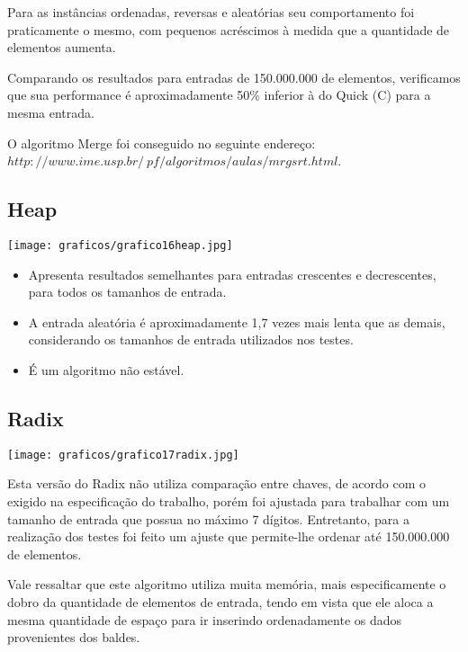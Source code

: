 \documentclass[12pt,a4paper]{article}
\begin{document}
Para as instâncias ordenadas, reversas e aleatórias seu comportamento foi praticamente o mesmo, com pequenos acréscimos à medida que a quantidade de elementos aumenta.

Comparando os resultados para entradas de 150.000.000 de elementos, verificamos que sua performance é aproximadamente 50\% inferior à do Quick (C) para a mesma entrada.  

O algoritmo Merge foi conseguido no seguinte endereço:\\
$http://www.ime.usp.br/~pf/algoritmos/aulas/mrgsrt.html$.








\subsection{Heap}
\begin{center}
\texttt{[image: graficos/grafico16heap.jpg]}
\end{center}
\begin{itemize}
\item Apresenta resultados semelhantes para entradas crescentes e decrescentes, para todos os tamanhos de entrada.
\item A entrada aleatória é aproximadamente 1,7 vezes mais lenta que as demais, considerando os tamanhos de entrada utilizados nos testes.
\item É um algoritmo não estável.
\end{itemize}






\subsection{Radix}
\begin{center}
\texttt{[image: graficos/grafico17radix.jpg]}
\end{center}

Esta versão do Radix não utiliza comparação entre chaves, de acordo com o exigido na especificação do trabalho, porém foi ajustada para trabalhar com um tamanho de entrada que possua no máximo 7 dígitos. Entretanto, para a realização dos testes foi feito um ajuste que permite-lhe ordenar até 150.000.000 de elementos.

Vale ressaltar que este algoritmo utiliza muita memória, mais especificamente o dobro da quantidade de elementos de entrada, tendo em vista que ele aloca a mesma quantidade de espaço para ir inserindo ordenadamente os dados provenientes dos baldes.
\end{document}
